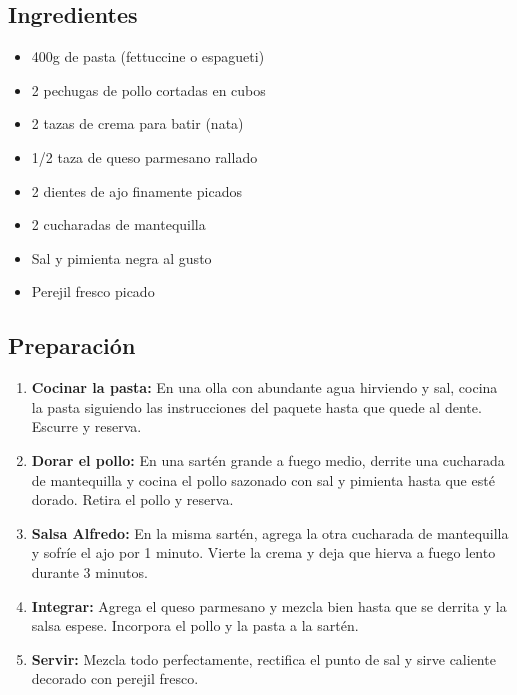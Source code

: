 \documentclass[11pt,a4paper]{article}
\begin{document}
\begin{minipage}[t]{0.45\linewidth}
    \subsection*{Ingredientes}
    \begin{itemize}[leftmargin=*]
        \item 400g de pasta (fettuccine o espagueti)
        \item 2 pechugas de pollo cortadas en cubos
        \item 2 tazas de crema para batir (nata)
        \item 1/2 taza de queso parmesano rallado
        \item 2 dientes de ajo finamente picados
        \item 2 cucharadas de mantequilla
        \item Sal y pimienta negra al gusto
        \item Perejil fresco picado
    \end{itemize}
\end{minipage}
\hfill
\begin{minipage}[t]{0.5\linewidth}
    \subsection*{Preparación}
    \begin{enumerate}[leftmargin=*]
        \item \textbf{Cocinar la pasta:} En una olla con abundante agua hirviendo y sal, cocina la pasta siguiendo las instrucciones del paquete hasta que quede al dente. Escurre y reserva.
        \item \textbf{Dorar el pollo:} En una sartén grande a fuego medio, derrite una cucharada de mantequilla y cocina el pollo sazonado con sal y pimienta hasta que esté dorado. Retira el pollo y reserva.
        \item \textbf{Salsa Alfredo:} En la misma sartén, agrega la otra cucharada de mantequilla y sofríe el ajo por 1 minuto. Vierte la crema y deja que hierva a fuego lento durante 3 minutos.
        \item \textbf{Integrar:} Agrega el queso parmesano y mezcla bien hasta que se derrita y la salsa espese. Incorpora el pollo y la pasta a la sartén.
        \item \textbf{Servir:} Mezcla todo perfectamente, rectifica el punto de sal y sirve caliente decorado con perejil fresco.
    \end{enumerate}
\end{minipage}
\end{document}
